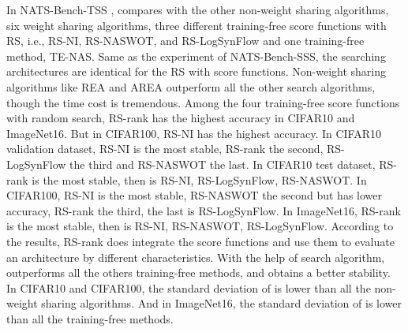 \documentclass[sigconf]{acmart}
\begin{document}
    In NATS-Bench-TSS \cite{Dong_2021},  compares \palg{} with the other 
    non-weight sharing algorithms, six weight sharing algorithms, three different training-free 
    score functions with RS, i.e., RS-NI, RS-NASWOT, and RS-LogSynFlow and one 
    training-free method, TE-NAS. Same as the experiment of NATS-Bench-SSS, the searching 
    architectures are identical for the RS with score functions. Non-weight sharing algorithms 
    like REA and AREA outperform all the other search algorithms, though the time cost is 
    tremendous. Among the four training-free score functions with random search, RS-rank has the 
    highest accuracy in CIFAR10 and ImageNet16. But in CIFAR100, RS-NI has the highest accuracy. 
    In CIFAR10 validation dataset, RS-NI is the most stable, RS-rank the second, RS-LogSynFlow the 
    third and RS-NASWOT the last. In CIFAR10 test dataset, RS-rank is the most stable, then is RS-NI, 
    RS-LogSynFlow, RS-NASWOT. In CIFAR100, RS-NI is the most stable, RS-NASWOT the second but 
    has lower accuracy, RS-rank the third, the last is RS-LogSynFlow. In ImageNet16, RS-rank is the 
    most stable, then is RS-NI, RS-NASWOT, RS-LogSynFlow. According to the results, RS-rank does 
    integrate the score functions and use them to evaluate an architecture by different characteristics. 
    With the help of search algorithm, \palg{} outperforms all the others training-free methods, 
    and obtains a better stability. In CIFAR10 and CIFAR100, the standard deviation of \palg{} is lower 
    than all the non-weight sharing algorithms. And in ImageNet16, the standard deviation of \palg{} is 
    lower than all the training-free methods. 
\end{document}
